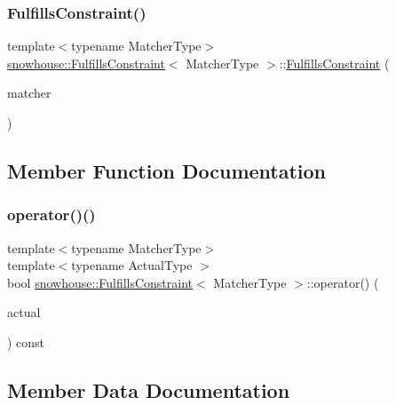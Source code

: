 \subsubsection{\texorpdfstring{FulfillsConstraint()}{FulfillsConstraint()}}
{\footnotesize\ttfamily template$<$typename Matcher\+Type$>$ \\
\mbox{\hyperlink{structsnowhouse_1_1FulfillsConstraint}{snowhouse\+::\+Fulfills\+Constraint}}$<$ Matcher\+Type $>$\+::\mbox{\hyperlink{structsnowhouse_1_1FulfillsConstraint}{Fulfills\+Constraint}} (\begin{DoxyParamCaption}\item[{const Matcher\+Type \&}]{matcher }\end{DoxyParamCaption})\hspace{0.3cm}{\ttfamily [inline]}}



\subsection{Member Function Documentation}
\mbox{\label{structsnowhouse_1_1FulfillsConstraint_a42dd02bea63bd27c2ef6147970f28f5b}} 
\subsubsection{\texorpdfstring{operator()()}{operator()()}}
{\footnotesize\ttfamily template$<$typename Matcher\+Type$>$ \\
template$<$typename Actual\+Type $>$ \\
bool \mbox{\hyperlink{structsnowhouse_1_1FulfillsConstraint}{snowhouse\+::\+Fulfills\+Constraint}}$<$ Matcher\+Type $>$\+::operator() (\begin{DoxyParamCaption}\item[{const Actual\+Type \&}]{actual }\end{DoxyParamCaption}) const\hspace{0.3cm}{\ttfamily [inline]}}



\subsection{Member Data Documentation}
\mbox{\label{structsnowhouse_1_1FulfillsConstraint_a577beb7d289d5c3496b90361c463f498}} 
